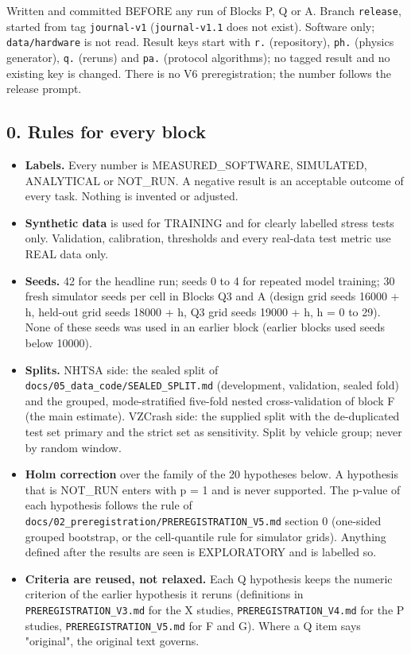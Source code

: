 


Written and committed BEFORE any run of Blocks P, Q or A. Branch \texttt{release}, started from tag \texttt{journal-v1} (\texttt{journal-v1.1} does not exist). Software only; \texttt{data/hardware} is not read. Result keys start with \texttt{r.} (repository), \texttt{ph.} (physics generator), \texttt{q.} (reruns) and \texttt{pa.} (protocol algorithms); no tagged result and no existing key is changed. There is no V6 preregistration; the number follows the release prompt.

\subsection*{0. Rules for every block}

\begin{itemize}
\item \textbf{Labels.} Every number is MEASURED\_SOFTWARE, SIMULATED, ANALYTICAL or NOT\_RUN. A negative result is an acceptable outcome of every task. Nothing is invented or adjusted.
\item \textbf{Synthetic data} is used for TRAINING and for clearly labelled stress tests only. Validation, calibration, thresholds and every real-data test metric use REAL data only.
\item \textbf{Seeds.} 42 for the headline run; seeds 0 to 4 for repeated model training; 30 fresh simulator seeds per cell in Blocks Q3 and A (design grid seeds 16000 + h, held-out grid seeds 18000 + h, Q3 grid seeds 19000 + h, h = 0 to 29). None of these seeds was used in an earlier block (earlier blocks used seeds below 10000).
\item \textbf{Splits.} NHTSA side: the sealed split of \texttt{docs/05\_data\_code/SEALED\_SPLIT.md} (development, validation, sealed fold) and the grouped, mode-stratified five-fold nested cross-validation of block F (the main estimate). VZCrash side: the supplied split with the de-duplicated test set primary and the strict set as sensitivity. Split by vehicle group; never by random window.
\item \textbf{Holm correction} over the family of the 20 hypotheses below. A hypothesis that is NOT\_RUN enters with p = 1 and is never supported. The p-value of each hypothesis follows the rule of \texttt{docs/02\_preregistration/PREREGISTRATION\_V5.md} section 0 (one-sided grouped bootstrap, or the cell-quantile rule for simulator grids). Anything defined after the results are seen is EXPLORATORY and is labelled so.
\item \textbf{Criteria are reused, not relaxed.} Each Q hypothesis keeps the numeric criterion of the earlier hypothesis it reruns (definitions in \texttt{PREREGISTRATION\_V3.md} for the X studies, \texttt{PREREGISTRATION\_V4.md} for the P studies, \texttt{PREREGISTRATION\_V5.md} for F and G). Where a Q item says "original", the original text governs.

\end{itemize}
